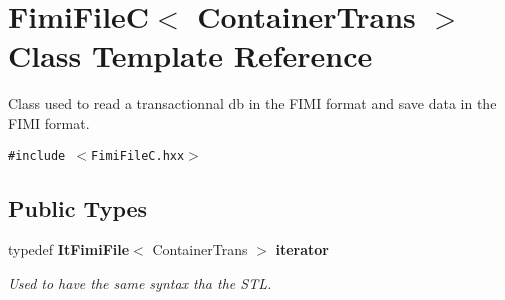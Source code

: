 \section{Fimi\-File\-C$<$ Container\-Trans $>$ Class Template Reference}
\label{class_fimi_file_c}
Class used to read a transactionnal db in the FIMI format and save data in the FIMI format.  


{\tt \#include $<$Fimi\-File\-C.hxx$>$}

\subsection*{Public Types}
\begin{CompactItemize}
\item 
typedef {\bf It\-Fimi\-File}$<$ Container\-Trans $>$ {\bf iterator}\label{class_fimi_file_c_af735df6c6fcef8a0bd52f8c3fc46f28}

\begin{CompactList}\small\item\em Used to have the same syntax tha the STL. \item\end{CompactList}\end{CompactItemize}
